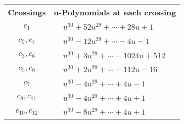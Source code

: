 \documentclass[1p]{elsarticle_modified}
\theoremstyle{definition}
\begin{document}
\begin{tabular}{m{50pt}|m{274pt}}
Crossings & \hspace{64pt}u-Polynomials at each crossing \\
\hline $$\begin{aligned}c_{1}\end{aligned}$$&$\begin{aligned}
&u^{30}+52 u^{29}+\cdots+28 u+1
\end{aligned}$\\
\hline $$\begin{aligned}c_{2},c_{4}\end{aligned}$$&$\begin{aligned}
&u^{30}-12 u^{29}+\cdots-4 u-1
\end{aligned}$\\
\hline $$\begin{aligned}c_{3},c_{6}\end{aligned}$$&$\begin{aligned}
&u^{30}+3 u^{29}+\cdots-1024 u+512
\end{aligned}$\\
\hline $$\begin{aligned}c_{5},c_{9}\end{aligned}$$&$\begin{aligned}
&u^{30}+2 u^{29}+\cdots-112 u-16
\end{aligned}$\\
\hline $$\begin{aligned}c_{7}\end{aligned}$$&$\begin{aligned}
&u^{30}-4 u^{29}+\cdots+4 u-1
\end{aligned}$\\
\hline $$\begin{aligned}c_{8},c_{11}\end{aligned}$$&$\begin{aligned}
&u^{30}-4 u^{29}+\cdots+4 u+1
\end{aligned}$\\
\hline $$\begin{aligned}c_{10},c_{12}\end{aligned}$$&$\begin{aligned}
&u^{30}-8 u^{29}+\cdots+4 u+1
\end{aligned}$\\
\hline
\end{tabular}\\~\\
\newpage\renewcommand{\arraystretch}{1}
\end{document}
